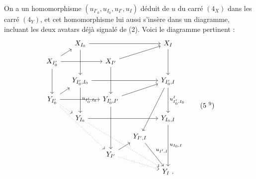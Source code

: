 \documentclass[11pt]{article}
\newcommand{\printedpage}[1]{\marginpar{\footnotesize p.~#1}}
\newcommand{\msp}[1]{\marginpar{\footnotesize [#1]}}
\begin{document}
\msp{page 16}
On a un homomorphisme $(u_{I'_0}, u_{I_0}, u_{I'}, u_I)$ déduit de $u$ du carré $(4_X)$ dans les carré $(4_Y)$, %
et cet homomorphisme lui aussi s'insère dans un diagramme, incluant les deux avatars déjà signalé de (2). Voici le diagramme pertinent : %
\printedpage{10}
\[
\begin{tikzcd}[column sep=small, row sep=small]
 & X_{I_0} \arrow[rrr] \arrow[dd] & & & X_I \arrow[dd] \\
X_{I'_0} \arrow[ur] \arrow[rr] \arrow[dd] & & X_{I'} \arrow[urr] \arrow[dd] & & \\
 & Y_{I'_0,I_0} \arrow[rrr] \arrow[dd, "u_{I'_0,I_0}"] & & & Y_{I'_0,I} \arrow[dd, "u^I_{I'_0,I_0}"] \arrow[dddl] \\
Y_{I'_0} \arrow[ur] \arrow[rr] \arrow[dr, dotted] \arrow[dddrr, dotted] & & Y_{I'_0,I'} \arrow[urr] \arrow[ddd] & & \\
 & Y_{I_0} \arrow[rrr] \arrow[dddrrr, dotted] & & & Y_{I_0,I} \arrow[ddd, "u_{I_0,I}"] \\
 & & & Y_{I',I} \arrow[ddr, "u_{I',I}"] & \\
 & & Y_{I'} \arrow[ur] \arrow[drr, dotted] & & \\
 & & & & Y_I\ .
\end{tikzcd}
\tag*{(5~\footnotemark[9])}
\]
\end{document}
